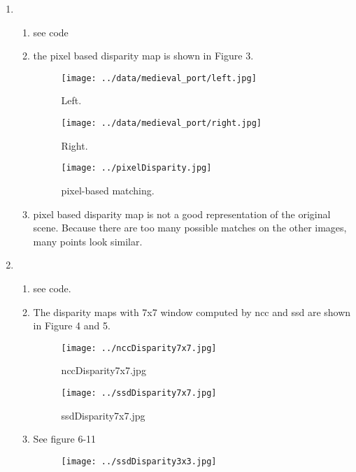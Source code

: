 \documentclass[a4paper, twoside, english]{article}
\begin{document}
\begin{enumerate}
	\item 
	\begin{enumerate}
		\item see code
		\item the pixel based disparity map is shown in Figure 3.
			\begin{figure}[h!]
			\begin{minipage}[b]{0.3\textwidth}
				\texttt{[image: ../data/medieval\_port/left.jpg]}
				\caption{Left.}
			\end{minipage}
			\hfill
			\begin{minipage}[b]{0.3\textwidth}
				\texttt{[image: ../data/medieval\_port/right.jpg]}
				\caption{Right.}
			\end{minipage}
			\hfill
			\begin{minipage}[b]{0.3\textwidth}
				\texttt{[image: ../pixelDisparity.jpg]}
				\caption{pixel-based matching.}
			\end{minipage}
			\hfill
		\end{figure}
		\item pixel based disparity map is not a good representation of the original scene. Because there are too many possible matches on the other images, many points look similar.
	\end{enumerate}
	\item 
	\begin{enumerate}
		\item see code.
		\item The disparity maps with 7x7 window computed by ncc and ssd are shown in Figure 4 and 5. 
		\begin{figure}[h!]
			\begin{minipage}[b]{0.45\textwidth}
				\texttt{[image: ../nccDisparity7x7.jpg]}
				\caption{nccDisparity7x7.jpg}
			\end{minipage}
			\hfill
			\begin{minipage}[b]{0.45\textwidth}
				\texttt{[image: ../ssdDisparity7x7.jpg]}
				\caption{ssdDisparity7x7.jpg}
			\end{minipage}
			\hfill
		\end{figure}
		\item See figure 6-11
		\begin{figure}[h!]
			\begin{minipage}[b]{0.3\textwidth}
				\texttt{[image: ../ssdDisparity3x3.jpg]}

\end{minipage}
\end{figure}
\end{enumerate}
\end{enumerate}
\end{document}
